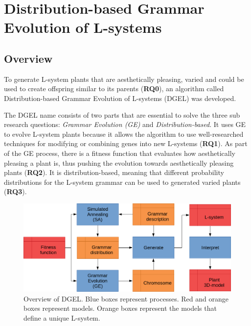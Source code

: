 \chapter{Distribution-based Grammar Evolution of L-systems}

\section{Overview}
To generate L-system plants that are aesthetically pleasing, varied and could be used to create offspring similar to its parents (\textbf{RQ0}), an algorithm called Distribution-based Grammar Evolution of L-systems (DGEL) was developed.

The DGEL name consists of two parts that are essential to solve the three sub research questions: \textit{Grammar Evolution (GE)} and \textit{Distribution-based}.
It uses GE to evolve L-system plants because it allows the algorithm to use well-researched techniques for modifying or combining genes into new L-systems (\textbf{RQ1}).
As part of the GE process, there is a fitness function that evaluates how aesthetically pleasing a plant is, thus pushing the evolution towards aesthetically pleasing plants (\textbf{RQ2}).
It is distribution-based, meaning that different probability distributions for the L-system grammar can be used to generated varied plants (\textbf{RQ3}).

\begin{figure}
    \centering
    \includegraphics[width=1.0\textwidth]{figures/dgel}
    \caption[Overview of DGEL]{Overview of DGEL. Blue boxes represent processes. Red and orange boxes represent models. Orange boxes represent the models that define a unique L-system.}
    \label{fig:dgel}
\end{figure}

